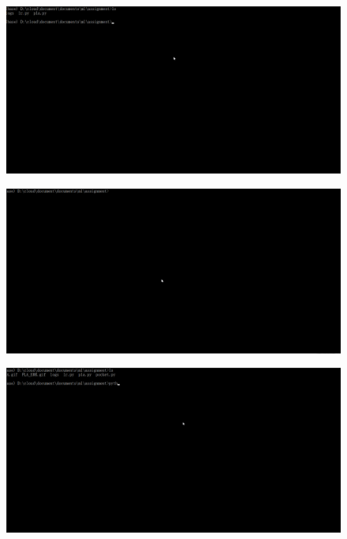 \documentclass[11pt]{article}
\makeatletter
\def\maxwidth{\ifdim\Gin@nat@width>\linewidth\linewidth
    \else\Gin@nat@width\fi}
\let\Oldincludegraphics\includegraphics
\renewcommand{\includegraphics}[1]{\Oldincludegraphics[width=.8\maxwidth]{#1}}
\makeatother
\begin{document}
    \begin{center}
    \end{center}
    { \hspace*{\fill} \\}
    
    \begin{figure}
\centering
\includegraphics{assignment/perception/pla.gif}
\caption{}
\end{figure}

    \begin{figure}
\centering
\includegraphics{assignment/perception/pla_err.gif}
\caption{}
\end{figure}

    \begin{figure}
\centering
\includegraphics{assignment/perception/pocket.gif}
\caption{}
\end{figure}
\end{document}
